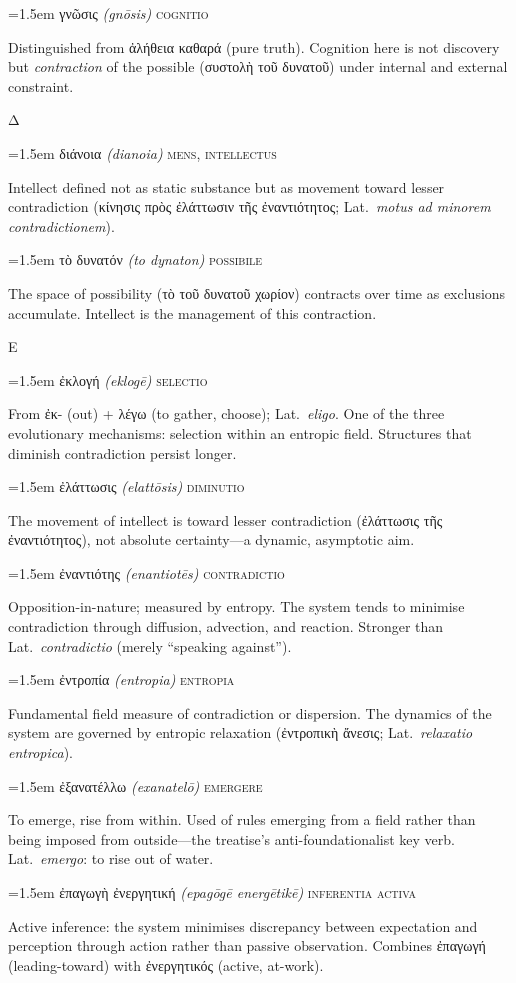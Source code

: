 \documentclass[12pt, oneside, openany]{memoir}
\newcommand{\gk}[1]{\textgreek{#1}}
\newcommand{\gkblue}[1]{{\color{greekblue}\textgreek{#1}}}
\newcommand{\gentry}[4]{%
  \noindent\hangindent=1.5em
  {\gkblue{#1}}\enspace
  {\itshape(#2)}\enspace
  {\color{rubricate}\textperiodcentered}\enspace
  {\scshape #3}\par
  \hspace*{1.5em}%
  \parbox[t]{\dimexpr\linewidth-1.5em\relax}{\strut#4\strut}%
  \par\addvspace{6pt}}
\begin{document}
\gentry{γνῶσις}{gn\={o}sis}{cognitio}
{Distinguished from \gk{ἀλήθεια καθαρά} (pure truth). Cognition here is not discovery but \emph{contraction} of the possible (\gk{συστολὴ τοῦ δυνατοῦ}) under internal and external constraint.}

\bigskip
{\centering\color{rubricate}\large\scshape Δ \par}\medskip

\gentry{διάνοια}{dianoia}{mens, intellectus}
{Intellect defined not as static substance but as movement toward lesser contradiction (\gk{κίνησις πρὸς ἐλάττωσιν τῆς ἐναντιότητος}; Lat.\ \textit{motus ad minorem contradictionem}).}

\gentry{τὸ δυνατόν}{to dynaton}{possibile}
{The space of possibility (\gk{τὸ τοῦ δυνατοῦ χωρίον}) contracts over time as exclusions accumulate. Intellect is the management of this contraction.}

\bigskip
{\centering\color{rubricate}\large\scshape Ε \par}\medskip

\gentry{ἐκλογή}{eklog\={e}}{selectio}
{From \gk{ἐκ-} (out) + \gk{λέγω} (to gather, choose); Lat.\ \textit{eligo}. One of the three evolutionary mechanisms: selection within an entropic field. Structures that diminish contradiction persist longer.}

\gentry{ἐλάττωσις}{elatt\={o}sis}{diminutio}
{The movement of intellect is toward lesser contradiction (\gk{ἐλάττωσις τῆς ἐναντιότητος}), not absolute certainty---a dynamic, asymptotic aim.}

\gentry{ἐναντιότης}{enantiot\={e}s}{contradictio}
{Opposition-in-nature; measured by entropy. The system tends to minimise contradiction through diffusion, advection, and reaction. Stronger than Lat.\ \textit{contradictio} (merely ``speaking against'').}

\gentry{ἐντροπία}{entropia}{entropia}
{Fundamental field measure of contradiction or dispersion. The dynamics of the system are governed by entropic relaxation (\gk{ἐντροπικὴ ἄνεσις}; Lat.\ \textit{relaxatio entropica}).}

\gentry{ἐξανατέλλω}{exanatel\={o}}{emergere}
{To emerge, rise from within. Used of rules emerging from a field rather than being imposed from outside---the treatise's anti-foundationalist key verb. Lat.\ \textit{emergo}: to rise out of water.}

\gentry{ἐπαγωγὴ ἐνεργητική}{epag\={o}g\={e} energ\={e}tik\={e}}{inferentia activa}
{Active inference: the system minimises discrepancy between expectation and perception through action rather than passive observation. Combines \gk{ἐπαγωγή} (leading-toward) with \gk{ἐνεργητικός} (active, at-work).}
\end{document}

